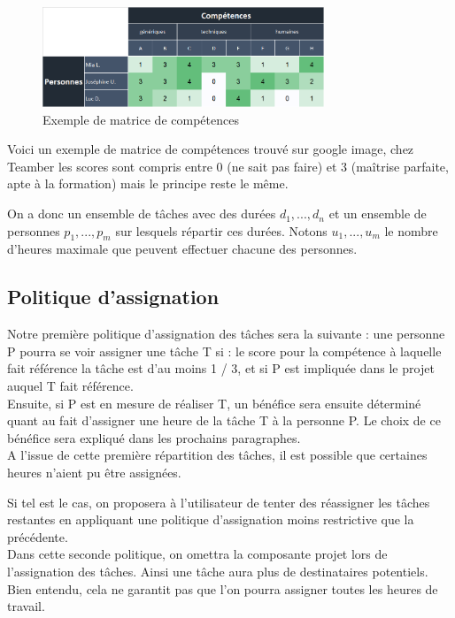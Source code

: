 \documentclass[12pt]{article}
\begin{document}
\begin{figure}[H]
\caption{Exemple de matrice de compétences}
\begin{center}
\includegraphics[width=0.75\textwidth]{matrice comp}
\end{center}
\end{figure}

Voici un exemple de matrice de compétences trouvé sur google image, chez Teamber les scores sont compris entre 0 (ne sait pas faire) et 3 (maîtrise parfaite, apte à la formation) mais le principe reste le même.


On a donc un ensemble de tâches avec des durées $d_1,..., d_{n}$ et un ensemble de personnes $p_1,..., p_{m}$ sur lesquels répartir ces durées.
Notons $u_1,..., u_{m}$ le nombre d'heures maximale que peuvent effectuer chacune des personnes.\\

\newpage
\subsection{Politique d'assignation}
Notre première politique d'assignation des tâches sera la suivante : une personne P pourra se voir assigner une tâche T si : le score pour la compétence à laquelle fait référence la tâche est d'au moins 1 / 3, et si P est impliquée dans le projet auquel T fait référence.\\
Ensuite, si P est en mesure de réaliser T, un bénéfice sera ensuite déterminé quant au fait d'assigner une heure de la tâche T à la personne P. Le choix de ce bénéfice sera expliqué dans les prochains paragraphes.\\

A l'issue de cette première répartition des tâches, il est possible que certaines heures n'aient pu être assignées.

Si tel est le cas, on proposera à l'utilisateur de tenter des réassigner les tâches restantes en appliquant une politique d'assignation moins restrictive que la précédente.\\
Dans cette seconde politique, on omettra la composante projet lors de l'assignation des tâches. Ainsi une tâche aura plus de destinataires potentiels.\\
Bien entendu, cela ne garantit pas que l'on pourra assigner toutes les heures de travail.
\end{document}
